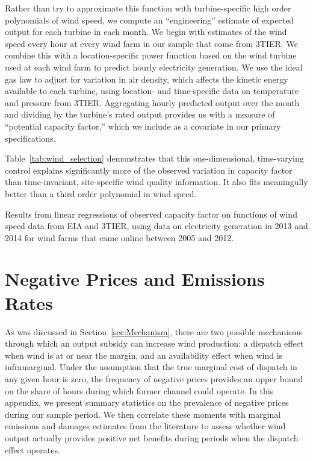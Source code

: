 \documentclass[12pt]{article}
\begin{document}
Rather than try to approximate this function with turbine-specific high order polynomials of wind speed, we compute an ``engineering'' estimate of expected output for each turbine in each month. We begin with estimates of the wind speed every hour at every wind farm in our sample that come from 3TIER. We combine this with a location-specific power function based on the wind turbine used at each wind farm to predict hourly electricity generation. We use the ideal gas law to adjust for variation in air density, which affects the kinetic energy available to each turbine, using location- and time-specific data on temperature and pressure from 3TIER. Aggregating hourly predicted output over the month and dividing by the turbine's rated output provides us with a measure of ``potential capacity factor,'' which we include as a covariate in our primary specifications.

Table~\ref{tab:wind_selection} demonstrates that this one-dimensional, time-varying control explains significantly more of the observed variation in capacity factor than time-invariant, site-specific wind quality information. It also fits meaningully better than a third order polynomial in wind speed.

\begin{table}[H]
\caption{Explanatory Power of Alternative Measures of Potential Generation \label{tab:wind_selection}}
\footnotesize
\begin{center}

\end{center}
Results from linear regressions of observed capacity factor on functions of wind speed data from EIA and 3TIER, using data on electricity generation in 2013 and 2014 for wind farms that came online between 2005 and 2012.
\end{table}



\clearpage
\section{Negative Prices and Emissions Rates \label{Appendix:NegativePrices}}

As was discussed in Section~\ref{sec:Mechanism}, there are two possible mechanisms through which an output subsidy can increase wind production: a dispatch effect when wind is at or near the margin, and an availability effect when wind is inframarginal. Under the assumption that the true marginal cost of dispatch in any given hour is zero, the frequency of negative prices provides an upper bound on the share of hours during which former channel could operate. In this appendix, we present summary statistics on the prevalence of negative prices during our sample period. We then correlate these moments with marginal emissions and damages estimates from the literature to assess whether wind output actually provides positive net benefits during periods when the dispatch effect operates. 
\end{document}
